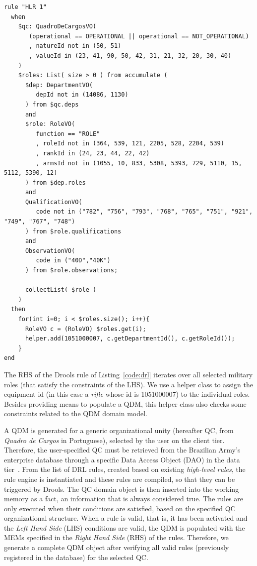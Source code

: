 \documentclass[AMA,STIX1COL]{WileyNJD-v2}
\newcommand{\callers}{\emph{high-level rules}\xspace}
\begin{document}
\begin{lstlisting}[frame=single, float=*t, language=DRL, caption=Example of a \emph{low-level Drools rule}, label={code:drl}]
rule "HLR 1"   	
  when
    $qc: QuadroDeCargosVO( 
       (operational == OPERATIONAL || operational == NOT_OPERATIONAL)
       , natureId not in (50, 51)
       , valueId in (23, 41, 90, 50, 42, 31, 21, 32, 20, 30, 40) 
    )	
    $roles: List( size > 0 ) from accumulate ( 
      $dep: DepartmentVO(
         depId not in (14086, 1130)
      ) from $qc.deps 
      and
      $role: RoleVO(
         function == "ROLE"
         , roleId not in (364, 539, 121, 2205, 528, 2204, 539) 
         , rankId in (24, 23, 44, 22, 42) 
         , armsId not in (1055, 10, 833, 5308, 5393, 729, 5110, 15, 5112, 5390, 12) 
      ) from $dep.roles 
      and  		
      QualificationVO(
         code not in ("782", "756", "793", "768", "765", "751", "921", "749", "767", "748")
      ) from $role.qualifications
      and
      ObservationVO(
         code in ("40D","40K")
      ) from $role.observations;
	
      collectList( $role )
    )	 		
  then		 
    for(int i=0; i < $roles.size(); i++){       	
      RoleVO c = (RoleVO) $roles.get(i);
      helper.add(1051000007, c.getDepartmentId(), c.getRoleId());
    }
end
\end{lstlisting}

The RHS of the Drools rule of Listing~\ref{code:drl} iterates over all selected military roles (that satisfy the constraints of the LHS). We use a helper class to assign the equipment id (in this case a \emph{rifle} whose id is 1051000007) to the individual roles. Besides providing means to populate a QDM, this helper class also checks some constraints related to the QDM domain model. 



A QDM is generated for a generic organizational unity (hereafter QC, from \emph{Quadro de Cargos} in Portuguese), selected by the user on the client tier. Therefore, the user-specified QC must be retrieved from the Brazilian Army's enterprise database through a specific Data Access Object (DAO) in the data tier~\cite{alur2003}. From the list of DRL rules, created based on existing \callers, the rule engine is instantiated and these rules are compiled, so that they can be triggered by Drools. The QC domain object is then inserted into the working memory as a fact, an information that is always considered true. The rules are only executed when their conditions are satisfied, based on the specified QC organizational structure. When a rule is valid, that is, it has been activated and the \emph{Left Hand Side} (LHS) conditions are valid, the QDM is populated with the MEMs specified in the \emph{Right Hand Side} (RHS) of the rules. Therefore, we generate a complete QDM object after verifying all valid rules (previously registered in the database) for the selected QC. 
\end{document}
